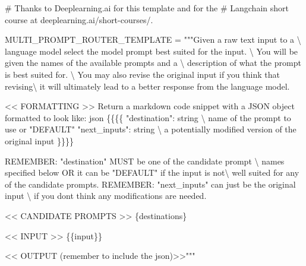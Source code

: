 \documentclass[
  letterpaper,
  DIV=11,
  numbers=noendperiod]{scrreprt}
\newenvironment{Shaded}{\begin{snugshade}}{\end{snugshade}}
\newcommand{\CharTok}[1]{\textcolor[rgb]{0.13,0.47,0.30}{#1}}
\newcommand{\CommentTok}[1]{\textcolor[rgb]{0.37,0.37,0.37}{#1}}
\newcommand{\NormalTok}[1]{\textcolor[rgb]{0.00,0.23,0.31}{#1}}
\newcommand{\OperatorTok}[1]{\textcolor[rgb]{0.37,0.37,0.37}{#1}}
\newcommand{\SpecialCharTok}[1]{\textcolor[rgb]{0.37,0.37,0.37}{#1}}
\newcommand{\StringTok}[1]{\textcolor[rgb]{0.13,0.47,0.30}{#1}}
\begin{document}
\begin{Shaded}
\begin{Highlighting}[]
\CommentTok{\# Thanks to Deeplearning.ai for this template and for the}
\CommentTok{\# Langchain short course at deeplearning.ai/short{-}courses/.}

\NormalTok{MULTI\_PROMPT\_ROUTER\_TEMPLATE }\OperatorTok{=} \StringTok{"""Given a raw text input to a }\CharTok{\textbackslash{}}
\StringTok{language model select the model prompt best suited for the input. }\CharTok{\textbackslash{}}
\StringTok{You will be given the names of the available prompts and a }\CharTok{\textbackslash{}}
\StringTok{description of what the prompt is best suited for. }\CharTok{\textbackslash{}}
\StringTok{You may also revise the original input if you think that revising}\CharTok{\textbackslash{}}
\StringTok{it will ultimately lead to a better response from the language model.}

\StringTok{\textless{}\textless{} FORMATTING \textgreater{}\textgreater{}}
\StringTok{Return a markdown code snippet with a JSON object formatted to look like:}
\StringTok{\textasciigrave{}\textasciigrave{}\textasciigrave{}json}
\SpecialCharTok{\{\{\{\{}
\StringTok{    "destination": string \textbackslash{} name of the prompt to use or "DEFAULT"}
\StringTok{    "next\_inputs": string \textbackslash{} a potentially modified version of the original input}
\SpecialCharTok{\}\}\}\}}
\StringTok{\textasciigrave{}\textasciigrave{}\textasciigrave{}}

\StringTok{REMEMBER: "destination" MUST be one of the candidate prompt }\CharTok{\textbackslash{}}
\StringTok{names specified below OR it can be "DEFAULT" if the input is not}\CharTok{\textbackslash{}}
\StringTok{well suited for any of the candidate prompts.}
\StringTok{REMEMBER: "next\_inputs" can just be the original input }\CharTok{\textbackslash{}}
\StringTok{if you don\textquotesingle{}t think any modifications are needed.}

\StringTok{\textless{}\textless{} CANDIDATE PROMPTS \textgreater{}\textgreater{}}
\SpecialCharTok{\{destinations\}}

\StringTok{\textless{}\textless{} INPUT \textgreater{}\textgreater{}}
\SpecialCharTok{\{\{}\StringTok{input}\SpecialCharTok{\}\}}

\StringTok{\textless{}\textless{} OUTPUT (remember to include the \textasciigrave{}\textasciigrave{}\textasciigrave{}json)\textgreater{}\textgreater{}"""}
\end{Highlighting}
\end{Shaded}
\end{document}
